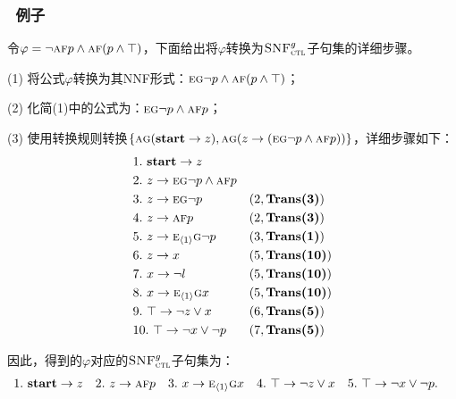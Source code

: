 \documentclass[9pt, CJK]{beamer}
\begin{document}
\begin{frame}
	\frametitle{~例子}
	\begin{example}\label{exmp:transbot}
		\tiny
		令$\varphi=\neg \textsc{a} \textsc{f} p \wedge \textsc{a}\textsc{f}(p \wedge \top)$，下面给出将$\varphi$转换为${\textsc{SNF}_{\textsc{ctl}}^g}$子句集的详细步骤。
		
		(1) 将公式$\varphi$转换为其NNF形式：$\textsc{e}\textsc{g} \neg p \wedge \textsc{a}\textsc{f}(p \wedge \top)$；
		
		(2) 化简(1)中的公式为：$\textsc{e}\textsc{g} \neg p \wedge \textsc{a}\textsc{f} p$；
		
		(3) 使用转换规则转换$\{\textsc{a}\textsc{g}(\textbf{start} \rightarrow z), \textsc{a}\textsc{g}(z \rightarrow (\textsc{e}\textsc{g} \neg p \wedge \textsc{a}\textsc{f} p))\}$，详细步骤如下：
		\begin{align*}
			&1.\ \textbf{start} \rightarrow z && \\
			&2.\ z \rightarrow \textsc{e}\textsc{g} \neg p \wedge \textsc{a}\textsc{f} p &&  \\
			&3.\ z \rightarrow  \textsc{e}\textsc{g} \neg p && (2, \textbf{Trans(3)})\\
			&4.\ z \rightarrow \textsc{a}\textsc{f} p && (2, \textbf{Trans(3)})\\
			&5.\ z \rightarrow  \textsc{e}_{{\langle{1}\rangle}}\textsc{g} \neg p  && (3, \textbf{Trans(1)})\\
			&6.\ z \rightarrow x && (5, \textbf{Trans(10)})\\
			&7.\ x\rightarrow \neg l && (5, \textbf{Trans(10)})\\
			&8.\ x\rightarrow \textsc{e}_{{\langle{1}\rangle}} \textsc{g} x&& (5, \textbf{Trans(10)})\\
			&9.\ \top \rightarrow \neg z \vee x && (6, \textbf{Trans(5)}) \\
			&10.\ \top \rightarrow \neg x \vee \neg p && (7, \textbf{Trans(5)})
		\end{align*}
		
		因此，得到的$\varphi$对应的${\textsc{SNF}_{\textsc{ctl}}^g}$子句集为：
		\begin{align*}
			&1.\ \textbf{start} \rightarrow z && 2.\ z \rightarrow \textsc{a}\textsc{f} p && 3.\ x\rightarrow \textsc{e}_{{\langle{1}\rangle}} \textsc{g} x
			&& 4.\ \top \rightarrow \neg z \vee x && 5.\ \top \rightarrow \neg x \vee \neg p.
		\end{align*}
	\end{example}
\end{frame}
\end{document}
